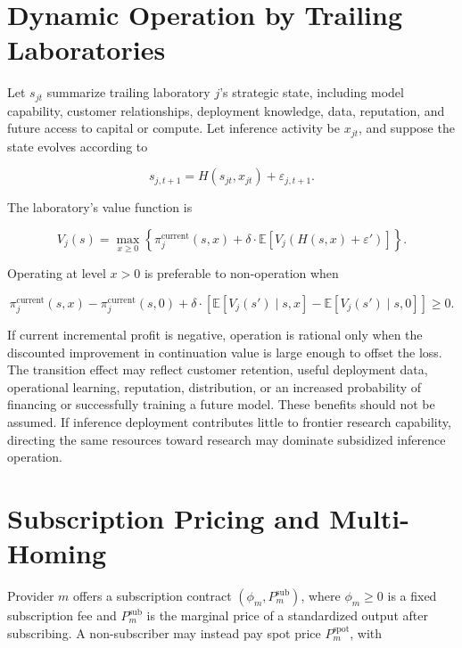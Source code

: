 \documentclass[11pt]{article}
\begin{document}
\section{Dynamic Operation by Trailing Laboratories}
\label{app:dynamic-loss}

Let $s_{jt}$ summarize trailing laboratory $j$'s strategic state, including model capability, customer relationships, deployment knowledge, data, reputation, and future access to capital or compute. Let inference activity be $x_{jt}$, and suppose the state evolves according to

\begin{equation}s_{j,t+1}=H(s_{jt},x_{jt})+\varepsilon_{j,t+1}.\end{equation}

The laboratory's value function is

\begin{equation}V_j(s)=\max_{x\geq0}\left\{\pi_j^{\mathrm{current}}(s,x)+\delta\cdot\mathbb E\left[V_j\left(H(s,x)+\varepsilon'\right)\right]\right\}.\end{equation}

Operating at level $x>0$ is preferable to non-operation when

\begin{equation}\pi_j^{\mathrm{current}}(s,x)-\pi_j^{\mathrm{current}}(s,0)+\delta\cdot\left[\mathbb E[V_j(s')\mid s,x]-\mathbb E[V_j(s')\mid s,0]\right]\geq0.\end{equation}

If current incremental profit is negative, operation is rational only when the discounted improvement in continuation value is large enough to offset the loss. The transition effect may reflect customer retention, useful deployment data, operational learning, reputation, distribution, or an increased probability of financing or successfully training a future model. These benefits should not be assumed. If inference deployment contributes little to frontier research capability, directing the same resources toward research may dominate subsidized inference operation.

\section{Subscription Pricing and Multi-Homing}
\label{app:subscriptions}

Provider $m$ offers a subscription contract $(\phi_m,P_m^{\mathrm{sub}})$, where $\phi_m\geq0$ is a fixed subscription fee and $P_m^{\mathrm{sub}}$ is the marginal price of a standardized output after subscribing. A non-subscriber may instead pay spot price $P_m^{\mathrm{spot}}$, with
\end{document}
